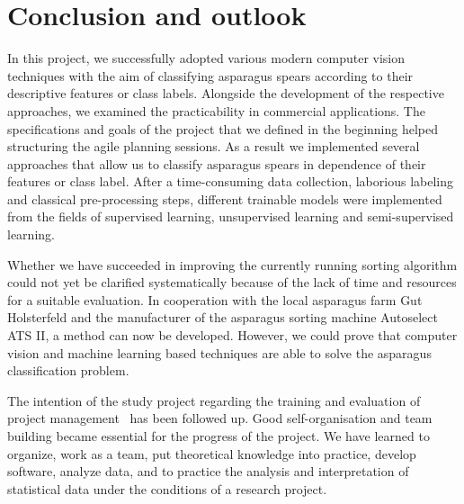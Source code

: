 \section{Conclusion and outlook}
\label{ch:Conclusion}

In this project, we successfully adopted various modern computer vision techniques with the aim of classifying asparagus spears according to their descriptive features or class labels. Alongside the development of the respective approaches, we examined the practicability in commercial applications. The specifications and goals of the project that we defined in the beginning helped structuring the agile planning sessions. As a result we implemented  several approaches that allow us to classify asparagus spears in dependence of their features or class label. After a time-consuming data collection, laborious labeling and classical pre-processing steps, different trainable models were implemented from the fields of supervised learning, unsupervised learning and semi-supervised learning.

Whether we have succeeded in improving the currently running sorting algorithm could not yet be clarified systematically because of the lack of time and resources for a suitable evaluation. In cooperation with the local asparagus farm Gut Holsterfeld and the manufacturer of the asparagus sorting machine Autoselect ATS II, a method can now be developed. However, we could prove that computer vision and machine learning based techniques are able to solve the asparagus classification problem.

The intention of the study project regarding the training and evaluation of project management~\citep{ studyregulations,moduledescription} has been followed up. Good self-organisation and team building became essential for the progress of the project. We have learned to organize, work as a team, put theoretical knowledge into practice, develop software, analyze data, and to practice the analysis and interpretation of statistical data under the conditions of a research project.

